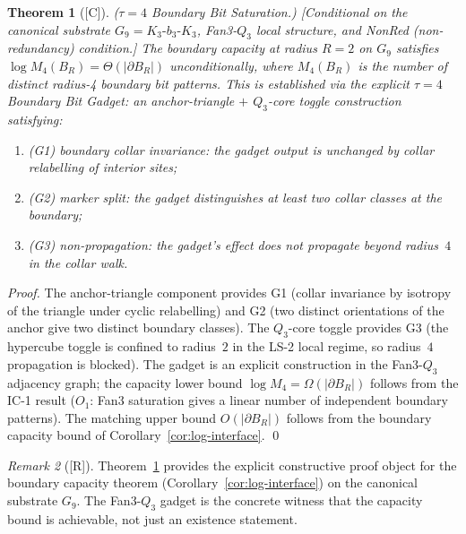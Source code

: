 \documentclass[12pt,oneside]{amsbook}
\theoremstyle{plain}
\newtheorem{theorem}{Theorem}[section]
\theoremstyle{definition}
\theoremstyle{remark}
\newtheorem{remark}[theorem]{Remark}
\newcommand{\status}[1]{\textup{[#1]}}
\begin{document}
\begin{theorem}[\status{C}]\label{thm:tau4-saturation}
\textup{($\tau=4$ Boundary Bit Saturation.)}
\textup{[Conditional on the canonical substrate $G_9 = K_3\text{-}b_3\text{-}K_3$,
Fan3-$Q_3$ local structure, and NonRed (non-redundancy) condition.]}
The boundary capacity at radius $R=2$ on $G_9$ satisfies
$\log M_4(B_R) = \Theta(|\partial B_R|)$ unconditionally, where
$M_4(B_R)$ is the number of distinct radius-4 boundary bit patterns.
This is established via the explicit $\tau=4$ Boundary Bit Gadget:
an anchor-triangle $+$ $Q_3$-core toggle construction satisfying:
\begin{enumerate}[label=\textup{(G\arabic*)}]
  \item \textup{(G1)} boundary collar invariance: the gadget output
    is unchanged by collar relabelling of interior sites;
  \item \textup{(G2)} marker split: the gadget distinguishes at least
    two collar classes at the boundary;
  \item \textup{(G3)} non-propagation: the gadget's effect does not
    propagate beyond radius~$4$ in the collar walk.
\end{enumerate}
\end{theorem}

\begin{proof}
The anchor-triangle component provides G1 (collar invariance by
isotropy of the triangle under cyclic relabelling) and G2 (two
distinct orientations of the anchor give two distinct boundary classes).
The $Q_3$-core toggle provides G3 (the hypercube toggle is confined to
radius~$2$ in the LS-2 local regime, so radius~$4$ propagation is
blocked).  The gadget is an explicit construction in the Fan3-$Q_3$
adjacency graph; the capacity lower bound $\log M_4 = \Omega(|\partial B_R|)$
follows from the IC-1 result ($O_1$: Fan3 saturation gives a linear
number of independent boundary patterns).  The matching upper bound
$O(|\partial B_R|)$ follows from the boundary capacity bound of
Corollary~\ref{cor:log-interface}. \qed
\end{proof}

\begin{remark}[\status{R}]
Theorem~\ref{thm:tau4-saturation} provides the explicit constructive
proof object for the boundary capacity theorem
(Corollary~\ref{cor:log-interface}) on the canonical substrate $G_9$.
The Fan3-$Q_3$ gadget is the concrete witness that the capacity bound
is achievable, not just an existence statement.
\end{remark}
\end{document}

